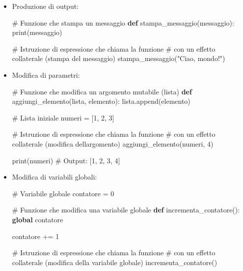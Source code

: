 \documentclass[
  letterpaper,
]{scrbook}
\newenvironment{Shaded}{\begin{snugshade}}{\end{snugshade}}
\newcommand{\BuiltInTok}[1]{\textcolor[rgb]{0.00,0.23,0.31}{#1}}
\newcommand{\CommentTok}[1]{\textcolor[rgb]{0.37,0.37,0.37}{#1}}
\newcommand{\DecValTok}[1]{\textcolor[rgb]{0.68,0.00,0.00}{#1}}
\newcommand{\KeywordTok}[1]{\textcolor[rgb]{0.00,0.23,0.31}{\textbf{#1}}}
\newcommand{\NormalTok}[1]{\textcolor[rgb]{0.00,0.23,0.31}{#1}}
\newcommand{\OperatorTok}[1]{\textcolor[rgb]{0.37,0.37,0.37}{#1}}
\newcommand{\StringTok}[1]{\textcolor[rgb]{0.13,0.47,0.30}{#1}}
\begin{document}
\begin{itemize}
\item
  Produzione di output:

\begin{Shaded}
\begin{Highlighting}[]
\CommentTok{\# Funzione che stampa un messaggio}
\KeywordTok{def}\NormalTok{ stampa\_messaggio(messaggio):}
  \BuiltInTok{print}\NormalTok{(messaggio)}

\CommentTok{\# Istruzione di espressione che chiama la funzione }
\CommentTok{\# con un effetto collaterale (stampa del messaggio)}
\NormalTok{stampa\_messaggio(}\StringTok{"Ciao, mondo!"}\NormalTok{)}
\end{Highlighting}
\end{Shaded}
\item
  Modifica di parametri:

\begin{Shaded}
\begin{Highlighting}[]
\CommentTok{\# Funzione che modifica un argomento mutabile (lista)}
\KeywordTok{def}\NormalTok{ aggiungi\_elemento(lista, elemento):}
\NormalTok{  lista.append(elemento)}

\CommentTok{\# Lista iniziale}
\NormalTok{numeri }\OperatorTok{=}\NormalTok{ [}\DecValTok{1}\NormalTok{, }\DecValTok{2}\NormalTok{, }\DecValTok{3}\NormalTok{]}

\CommentTok{\# Istruzione di espressione che chiama la funzione }
\CommentTok{\# con un effetto collaterale (modifica dell\textquotesingle{}argomento)}
\NormalTok{aggiungi\_elemento(numeri, }\DecValTok{4}\NormalTok{)}

\BuiltInTok{print}\NormalTok{(numeri)  }\CommentTok{\# Output: [1, 2, 3, 4]}
\end{Highlighting}
\end{Shaded}
\item
  Modifica di variabili globali:

\begin{Shaded}
\begin{Highlighting}[]
\CommentTok{\# Variabile globale}
\NormalTok{contatore }\OperatorTok{=} \DecValTok{0}

\CommentTok{\# Funzione che modifica una variabile globale}
\KeywordTok{def}\NormalTok{ incrementa\_contatore():}
  \KeywordTok{global}\NormalTok{ contatore}

\NormalTok{  contatore }\OperatorTok{+=} \DecValTok{1}

\CommentTok{\# Istruzione di espressione che chiama la funzione }
\CommentTok{\# con un effetto collaterale (modifica della variabile globale)}
\NormalTok{incrementa\_contatore()}


\end{Highlighting}
\end{Shaded}
\end{itemize}
\end{document}
